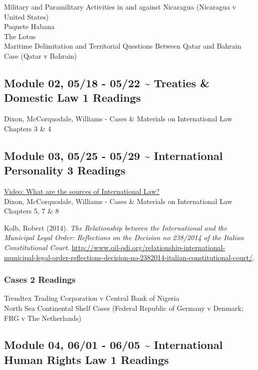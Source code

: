 \documentclass[10pt,]{article}
\begin{document}
Military and Paramilitary Activities in and against Nicaragua (Nicaragua
v United States)\\
Paquete Habana\\
The Lotus\\
Maritime Delimitation and Territorial Questions Between Qatar and
Bahrain Case (Qatar v Bahrain)

\hypertarget{module-02-0518---0522-treaties-domestic-law-1-readings}{%
\subsection{Module 02, 05/18 - 05/22 \textasciitilde{} Treaties \&
Domestic Law \textbar{} 1
Readings}\label{module-02-0518---0522-treaties-domestic-law-1-readings}}

Dixon, McCorquodale, Williams - Cases \& Materials on International Law
Chapters 3 \& 4

\hypertarget{module-03-0525---0529-international-personality-3-readings}{%
\subsection{Module 03, 05/25 - 05/29 \textasciitilde{} International
Personality \textbar{} 3
Readings}\label{module-03-0525---0529-international-personality-3-readings}}

\href{https://www.youtube.com/watch?v=0ViSYjt-wGw}{Video: What are the
sources of International Law?}\\
Dixon, McCorquodale, Williams - Cases \& Materials on International Law
Chapters 5, 7 \& 8

Kolb, Robert (2014).
\emph{The Relationship between the International and the Municipal Legal Order: Reflections on the Decision no 238/2014 of the Italian Constitutional Court}.
\url{http://www.qil-qdi.org/relationship-international-municipal-legal-order-reflections-decision-no-2382014-italian-constitutional-court/}.

\hypertarget{cases-2-readings}{%
\subsubsection{Cases \textbar{} 2 Readings}\label{cases-2-readings}}

Trendtex Trading Corporation v Central Bank of Nigeria\\
North Sea Continental Shelf Cases (Federal Republic of Germany v
Denmark; FRG v The Netherlands)

\hypertarget{module-04-0601---0605-international-human-rights-law-1-readings}{%
\subsection{Module 04, 06/01 - 06/05 \textasciitilde{} International
Human Rights Law \textbar{} 1
Readings}\label{module-04-0601---0605-international-human-rights-law-1-readings}}
\end{document}
